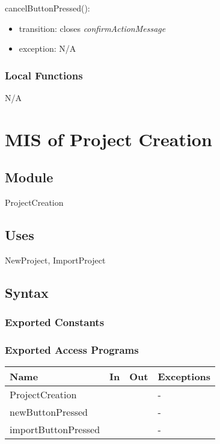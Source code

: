 \documentclass[12pt, titlepage]{article}
\begin{document}
	\noindent cancelButtonPressed():
	\begin{itemize}
		\item transition: closes \textit{confirmActionMessage}
		\item exception: N/A
	\end{itemize}
	
	
	\subsubsection{Local Functions}
	
	N/A
	
	\newpage
	
	\section{MIS of Project Creation} \label{Module} 
	
	\subsection{Module}
	
	ProjectCreation
	
	\subsection{Uses}
	NewProject, ImportProject
	
	\subsection{Syntax}
	
	\subsubsection{Exported Constants}
	
	\subsubsection{Exported Access Programs}
	
	\begin{center}
		\begin{tabular}{p{2cm} p{4cm} p{4cm} p{2cm}}
			\hline
			\textbf{Name} & \textbf{In} & \textbf{Out} & \textbf{Exceptions} \\
			\hline
			ProjectCreation &  &  & - \\
			\hline
			newButtonPressed &  &  & - \\
			\hline
			importButtonPressed &  &  & - \\
			\hline
		\end{tabular}
	\end{center}
	
\end{document}
